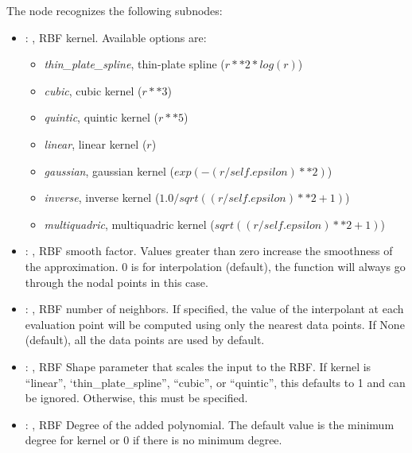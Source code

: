 \begin{itemize}
      The  node recognizes the following subnodes:
      \begin{itemize}
        \item {}: ,
          RBF kernel.                                                  Available options are:
          \begin{itemize}                                                  \item
          \textit{thin\_plate\_spline}, thin-plate spline ($r**2 * log(r)$)
          \item \textit{cubic}, cubic kernel ($r**3$)
          \item \textit{quintic}, quintic kernel ($r**5$)
          \item \textit{linear}, linear kernel ($r$)
          \item \textit{gaussian}, gaussian kernel ($exp(-(r/self.epsilon)**2)$)
          \item \textit{inverse}, inverse kernel ($1.0/sqrt((r/self.epsilon)**2 + 1)$)
          \item \textit{multiquadric}, multiquadric kernel ($sqrt((r/self.epsilon)**2 + 1)$)
          \end{itemize}

        \item {}: ,
          RBF smooth factor. Values greater than zero increase the smoothness of the approximation.
          0 is for interpolation (default), the function will always go through the nodal points in
          this case.

        \item {}: ,
          RBF number of neighbors. If specified, the value of the interpolant at each
          evaluation point will be computed using only the nearest data points.
          If None (default), all the data points are used by default.

        \item {}: ,
          RBF Shape parameter that scales the input to the RBF.
          If kernel is ``linear'', ‘thin\_plate\_spline'', ``cubic'', or ``quintic'', this
          defaults to 1 and can be ignored. Otherwise, this must be specified.

        \item {}: ,
          RBF Degree of the added polynomial. The default value is
          the minimum degree for kernel or 0 if there is no minimum degree.


\end{itemize}
\end{itemize}
